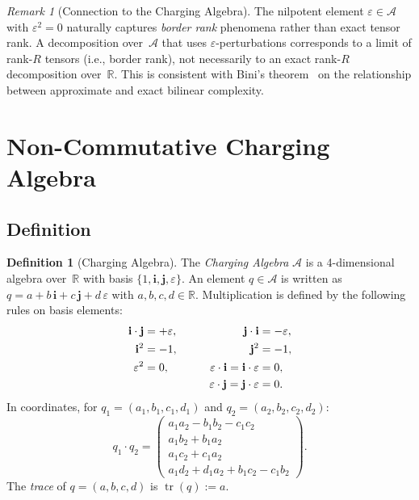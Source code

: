 \documentclass[11pt,a4paper]{article}
\theoremstyle{definition}
\newtheorem{definition}[theorem]{Definition}
\theoremstyle{remark}
\newtheorem{remark}[theorem]{Remark}
\DeclareMathOperator{\tr}{tr}
\begin{document}
\begin{remark}[Connection to the Charging Algebra]
\label{rem:border-rank-connection}
The nilpotent element $\varepsilon \in \mathcal{A}$ with
$\varepsilon^2 = 0$ naturally captures \emph{border rank} phenomena
rather than exact tensor rank. A decomposition over~$\mathcal{A}$
that uses $\varepsilon$-perturbations corresponds to a limit of
rank-$R$ tensors (i.e., border rank), not necessarily to an exact
rank-$R$ decomposition over~$\mathbb{R}$. This is consistent with
Bini's theorem~\cite{Bini1980} on the relationship between
approximate and exact bilinear complexity.
\end{remark}

\section{Non-Commutative Charging Algebra}\label{sec:algebra}

\subsection{Definition}

\begin{definition}[Charging Algebra]\label{def:charging}
The \emph{Charging Algebra} $\mathcal{A}$ is a 4-dimensional algebra
over~$\mathbb{R}$ with basis $\{1, \mathbf{i}, \mathbf{j}, \varepsilon\}$.
An element $q \in \mathcal{A}$ is written as
$q = a + b\,\mathbf{i} + c\,\mathbf{j} + d\,\varepsilon$ with
$a, b, c, d \in \mathbb{R}$. Multiplication is defined by the
following rules on basis elements:
\begin{alignat}{4}
  \mathbf{i} \cdot \mathbf{j} &= +\varepsilon, &\qquad
  \mathbf{j} \cdot \mathbf{i} &= -\varepsilon, \label{eq:ij-rule}\\
  \mathbf{i}^2 &= -1, &\qquad
  \mathbf{j}^2 &= -1, \label{eq:sq-rule}\\
  \varepsilon^2 &= 0, &\qquad
  \varepsilon \cdot \mathbf{i} = \mathbf{i} \cdot \varepsilon
  &= 0, \label{eq:eps-rules}\\
  && \varepsilon \cdot \mathbf{j} = \mathbf{j} \cdot \varepsilon &= 0.
  \notag
\end{alignat}
In coordinates, for $q_1 = (a_1, b_1, c_1, d_1)$ and
$q_2 = (a_2, b_2, c_2, d_2)$:
\begin{equation}\label{eq:mul-formula}
  q_1 \cdot q_2 =
  \begin{pmatrix}
    a_1 a_2 - b_1 b_2 - c_1 c_2 \\
    a_1 b_2 + b_1 a_2 \\
    a_1 c_2 + c_1 a_2 \\
    a_1 d_2 + d_1 a_2 + b_1 c_2 - c_1 b_2
  \end{pmatrix}.
\end{equation}
The \emph{trace} of $q = (a, b, c, d)$ is $\tr(q) := a$.
\end{definition}
\end{document}
